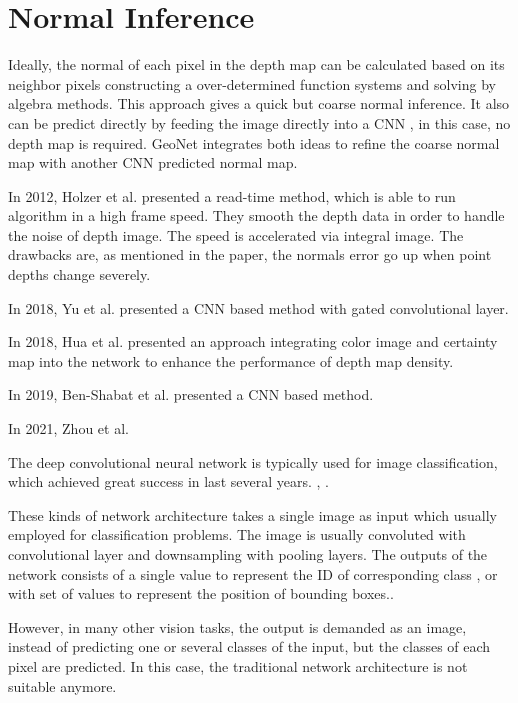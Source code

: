 \section{Normal Inference}



Ideally, the normal of each pixel in the depth map can be calculated based on its neighbor pixels constructing a over-determined function systems and solving by algebra methods\cite{geometry_based_solution}. This approach gives a quick but coarse normal inference. It also can be predict directly by feeding the image directly into a CNN \cite{Eigen}, in this case, no depth map is required.
GeoNet\cite{GeoNet} integrates both ideas to refine the coarse normal map with another CNN predicted normal map. 

In 2012, Holzer et al. \cite{Holzer.S} presented a read-time method, which is able to run algorithm in a high frame speed. They smooth the depth data in order to handle the noise of depth image. The speed is accelerated via integral image. The drawbacks are, as mentioned in the paper, the normals error go up when point depths change severely.

In 2018, Yu et al. \cite{gconv} presented a CNN based method with gated convolutional layer.

In 2018, Hua et al. \cite{guided} presented an approach integrating color image and certainty map into the network to enhance the performance of depth map density.

In 2019, Ben-Shabat et al. \cite{Ben-Shabat_2019_CVPR} presented a CNN based method.

In 2021, Zhou et al.  \cite{zhou2021fast}

The deep convolutional neural network is typically used for image classification, which achieved great success in last several years. \cite{yolov3}, \cite{efficientDet}.

These kinds of network architecture takes a single image as input which usually employed for classification problems. The image is usually convoluted with convolutional layer and downsampling with pooling layers. The outputs of the network consists of a single value to represent the ID of corresponding class \cite{efficientDet}, or with set of values to represent the position of bounding boxes.\cite{yolov3}.

However, in many other vision tasks, the output is demanded as an image, instead of predicting one or several classes of the input, but the classes of each pixel are predicted. In this case, the traditional network architecture is not suitable anymore.

